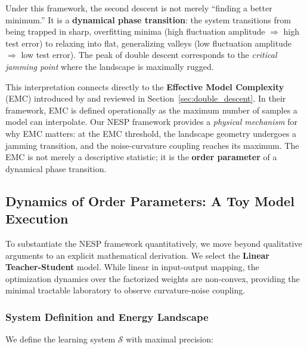 \documentclass[
  journal=largetwo,
  simfonts=false,
  year=2025,
  volume=37,
]{cup-journal}
\begin{document}
\begin{remark}
Under this framework, the second descent is not merely ``finding a better minimum.'' It is a \textbf{dynamical phase transition}: the system transitions from being trapped in sharp, overfitting minima (high fluctuation amplitude $\Rightarrow$ high test error) to relaxing into flat, generalizing valleys (low fluctuation amplitude $\Rightarrow$ low test error). The peak of double descent corresponds to the \textit{critical jamming point} where the landscape is maximally rugged.

This interpretation connects directly to the \textbf{Effective Model Complexity} (EMC) introduced by \cite{nakkiran_deep_2019} and reviewed in Section~\ref{sec:double_descent}. In their framework, EMC is defined operationally as the maximum number of samples a model can interpolate. Our NESP framework provides a \textit{physical mechanism} for why EMC matters: at the EMC threshold, the landscape geometry undergoes a jamming transition, and the noise-curvature coupling reaches its maximum. The EMC is not merely a descriptive statistic; it is the \textbf{order parameter} of a dynamical phase transition.
\end{remark}

\subsection{Dynamics of Order Parameters: A Toy Model Execution}\label{sec:toy_model}

To substantiate the NESP framework quantitatively, we move beyond qualitative arguments to an explicit mathematical derivation. We select the \textbf{Linear Teacher-Student} model. While linear in input-output mapping, the optimization dynamics over the factorized weights are non-convex, providing the minimal tractable laboratory to observe curvature-noise coupling.

\subsubsection{System Definition and Energy Landscape}

We define the learning system $\mathcal{S}$ with maximal precision:
\end{document}
